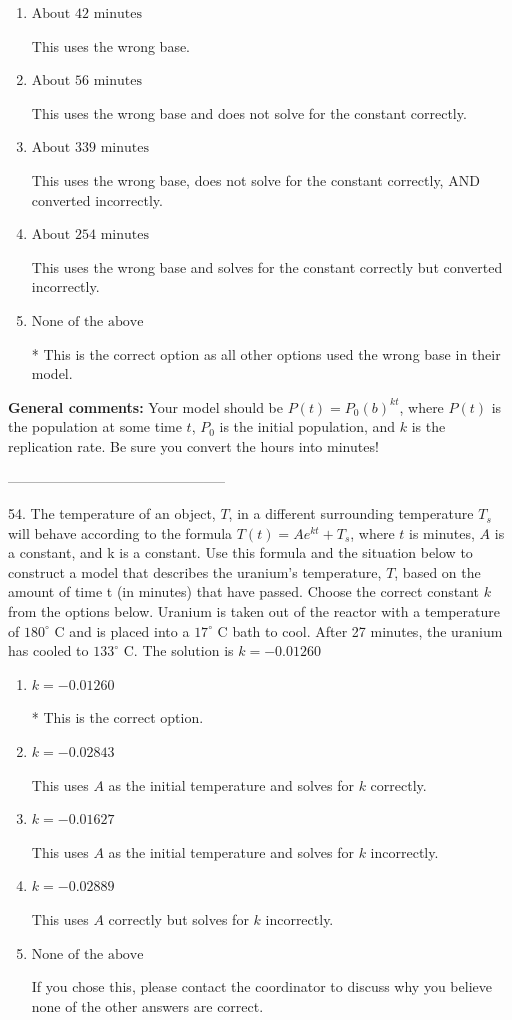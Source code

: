 \documentclass{extbook}[14pt]
\begin{document}
\begin{enumerate}[label=\Alph*.] 
\item $ \text{About } 42 \text{ minutes} $ 

 This uses the wrong base. 
\item $ \text{About } 56 \text{ minutes} $ 

 This uses the wrong base and does not solve for the constant correctly. 
\item $ \text{About } 339 \text{ minutes} $ 

 This uses the wrong base, does not solve for the constant correctly, AND converted incorrectly. 
\item $ \text{About } 254 \text{ minutes} $ 

 This uses the wrong base and solves for the constant correctly but converted incorrectly. 
\item $ \text{None of the above} $ 

 * This is the correct option as all other options used the wrong base in their model. 
\end{enumerate} 
 
\textbf{General comments:} Your model should be $P(t) = P_0(b)^{kt}$, where $P(t)$ is the population at some time $t$, $P_0$ is the initial population, and $k$ is the replication rate. Be sure you convert the hours into minutes!

-----------------------------------------------

54. The temperature of an object, $T$, in a different surrounding temperature $T_s$ will behave according to the formula $T(t) = Ae^{kt} + T_s$, where $t$ is minutes, $A$ is a constant, and k is a constant. Use this formula and the situation below to construct a model that describes the uranium's temperature, $T$, based on the amount of time t (in minutes) that have passed. Choose the correct constant $k$ from the options below.
Uranium is taken out of the reactor with a temperature of $180^{\circ}$ C and is placed into a $17^{\circ}$ C bath to cool. After 27 minutes, the uranium has cooled to $133^{\circ}$ C. 
The solution is $ k = -0.01260 $ 

\begin{enumerate}[label=\Alph*.] 
\item $ k = -0.01260 $ 

 * This is the correct option. 
\item $ k = -0.02843 $ 

 This uses $A$ as the initial temperature and solves for $k$ correctly. 
\item $ k = -0.01627 $ 

 This uses $A$ as the initial temperature and solves for $k$ incorrectly. 
\item $ k = -0.02889 $ 

 This uses $A$ correctly but solves for $k$ incorrectly. 
\item $ \text{None of the above} $ 

 If you chose this, please contact the coordinator to discuss why you believe none of the other answers are correct. 
\end{enumerate} 
 
\end{document}
